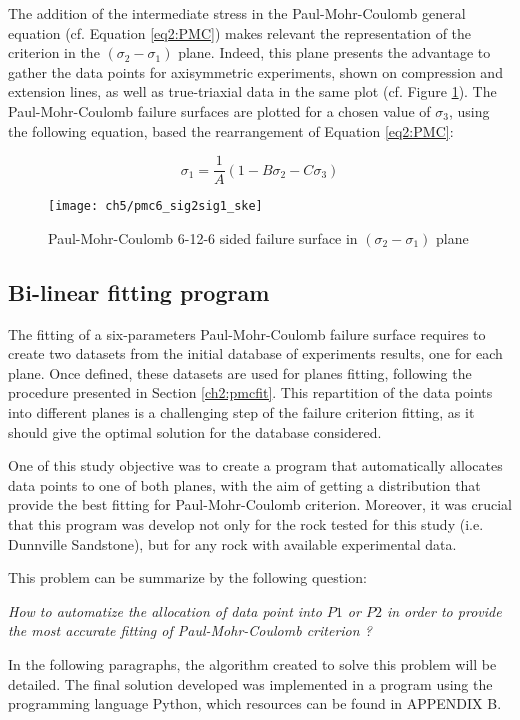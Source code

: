 The addition of the intermediate stress in the Paul-Mohr-Coulomb general equation (cf. Equation \ref{eq2:PMC}) makes relevant the representation of the criterion in the $(\sigma_2-\sigma_1)$ plane. Indeed, this plane presents the advantage to gather the data points for axisymmetric experiments, shown on compression and extension lines, as well as true-triaxial data in the same plot (cf. Figure \ref{fig5:6pmc_sig2sig1}). The Paul-Mohr-Coulomb failure surfaces are plotted for a chosen value of $\sigma_3$, using the following equation, based the rearrangement of Equation \ref{eq2:PMC}:

\begin{equation}\label{eq5:pmc_sig2sig1}
    \sigma_1 = \frac{1}{A}\left(1-B\sigma_{2}-C\sigma_{3}\right)
\end{equation}
\begin{figure}
    \centering
    \texttt{[image: ch5/pmc6\_sig2sig1\_ske]}
    \caption{Paul-Mohr-Coulomb 6-12-6 sided failure surface in $(\sigma_2-\sigma_1)$ plane}
    \label{fig5:6pmc_sig2sig1}
\end{figure}

\subsection{Bi-linear fitting program}

The fitting of a six-parameters Paul-Mohr-Coulomb failure surface requires to create two datasets from the initial database of experiments results, one for each plane. Once defined, these datasets are used for planes fitting, following the procedure presented in Section \ref{ch2:pmcfit}. This repartition of the data points into different planes is a challenging step of the failure criterion fitting, as it should give the optimal solution for the database considered. 

One of this study objective was to create a program that automatically allocates data points to one of both planes, with the aim of getting a distribution that provide the best fitting for Paul-Mohr-Coulomb criterion. Moreover, it was crucial that this program was develop not only for the rock tested for this study (i.e. Dunnville Sandstone), but for any rock with available experimental data. 

This problem can be summarize by the following question:
\begin{center}
    \emph{How to automatize the allocation of data point into $P1$ or $P2$ in order to provide the most accurate fitting of Paul-Mohr-Coulomb criterion ?}
\end{center}
In the following paragraphs, the algorithm created to solve this problem will be detailed. The final solution developed was implemented in a program using the programming language Python, which resources can be found in APPENDIX B. 

